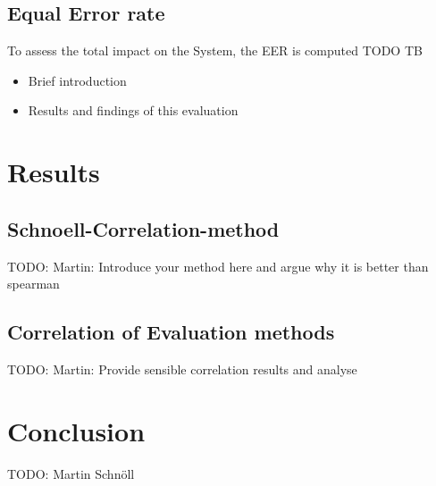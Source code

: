 \documentclass[10pt,twocolumn,letterpaper]{article}
\begin{document}
\subsection{Equal Error rate}
To assess the total impact on the System, the EER is computed
TODO TB

\begin{itemize}
 \item Brief introduction
 \item Results and findings of this evaluation
\end{itemize}


\section{Results}
\subsection{Schnoell-Correlation-method}
TODO: Martin: Introduce your method here and argue why it is better than spearman

\subsection{Correlation of Evaluation methods}
TODO: Martin:
Provide sensible correlation results and analyse


\section{Conclusion}
TODO: Martin Schnöll


{\small


}
\end{document}
